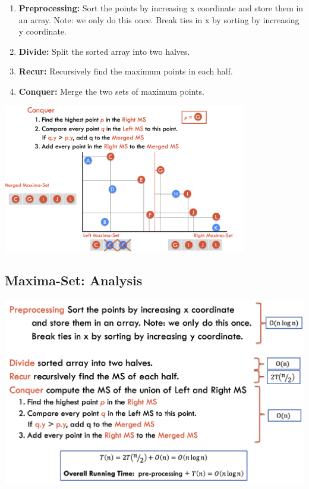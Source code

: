 \documentclass[12pt]{article}
\newcommand{\1}{\space \quad}
\newcommand{\2}{\quad \quad \quad}
\newcommand{\3}{\quad \quad \quad \quad \space}
\newcommand{\4}{\quad \quad \quad \quad \quad \quad}
\newcommand{\5}{\quad \quad \quad \quad \quad \quad \quad \space}
\begin{document}
\begin{enumerate}
  \item \textbf{Preprocessing:} Sort the points by increasing x coordinate and store them in an array. 
  Note: we only do this once. Break ties in x by sorting by increasing y coordinate.
  \item \textbf{Divide:} Split the sorted array into two halves.
  \item \textbf{Recur:} Recursively find the maximum points in each half.
  \item \textbf{Conquer:} Merge the two sets of maximum points.
\end{enumerate}
\begin{center}
  \includegraphics*[width=0.8\textwidth]{image36.png}
\end{center}

\subsection{Maxima-Set: Analysis}
\begin{center}
  \includegraphics*[width=\textwidth]{image37.png}
\end{center}
\end{document}
